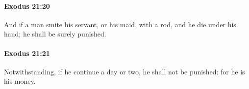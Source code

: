 		\paragraph{Exodus 21:20} %
			\label{EXODUS-21-20}

			And if a man smite his servant, or his maid, with a rod, and he die under his hand; he shall be surely punished.


		\paragraph{Exodus 21:21} %
			\label{EXODUS-21-21}

			Notwithstanding, if he continue a day or two, he shall not be punished: for he is his money.


